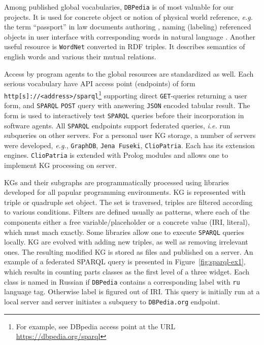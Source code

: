 \documentclass[
]{ceurart}
\begin{document}
Among published global vocabularies, \texttt{DBPedia} is of most valuable for our projects.  It is used for concrete object or notion of physical world reference, \emph{e.g.} the term ``passport'' in law documents authoring \cite{}, naming (labeling) referenced objects in user interface with corresponding words in natural language \cite{github-db}.  Another useful resource is \texttt{WordNet} converted in RDF triples.  It describes semantics of english words and various their mutual relations.

Access by program agents to the global resources are standardized as well.  Each serious vocabulary have API access point (endpoints) of form
\verb|http[s]://<address>/sparql|\footnote{For example, see DBpedia access point at the URL \url{https://dbpedia.org/sparql}} supporting direct \texttt{GET}-queries returning a user form, and \texttt{SPARQL} \texttt{POST} query with answering \texttt{JSON} encoded tabular result.  The form is used to interactively test \texttt{SPARQL} queries before their incorporation in software agents.  All \texttt{SPARQL} endpoints support federated queries, \emph{i.e.} run subqueries on other servers.   For a personal user KG storage, a number of servers were developed, \emph{e.g.}, \texttt{GraphDB}, \texttt{Jena Fuseki}, \texttt{ClioPatria}.  Each has its extension engines.  \texttt{ClioPatria} is extended with Prolog modules and allows one to implement KG processing on server.

KGs and their subgraphs are programmatically processed using libraries developed for all papular programming environments.  KG is represented with triple or quadruple set object.  The set is traversed, triples are filtered according to various conditions.  Filters are defined usually as patterns, where each of the components either a free variable/placeholder or a concrete value (IRI, literal), which must mach exactly.   Some libraries allow one to execute \texttt{SPARQL} queries locally.  KG are evolved with adding new triples, as well as removing irrelevant ones.  The resulting modified KG is stored as files and published on a server.  An example of a federated SPARQL query is presented in Figure~\ref{fig:sparql-ex1}, which results in counting parts classes as the first level of a three widget.  Each class is named in Russian if \texttt{DBPedia} contains a corresponding label with \texttt{ru} language tag.  Otherwise label is figured out of IRI.  This query is initially run at a local server and server initiates a subquery to \texttt{DBPedia.org} endpoint.
\end{document}
